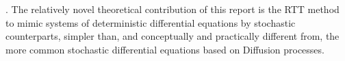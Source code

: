 \documentclass{article}
\begin{document}


\bigskip

. The relatively novel theoretical contribution of this report is the RTT method to mimic systems of deterministic differential equations by stochastic counterparts, simpler than, and conceptually and practically different from, the more common stochastic differential equations based on Diffusion processes.
\end{document}
